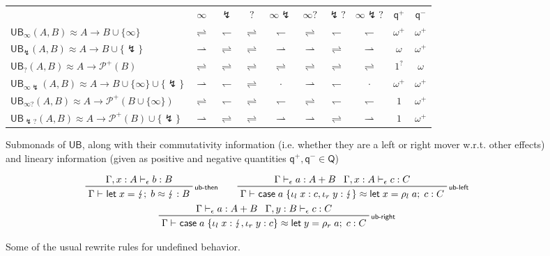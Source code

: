 \documentclass[acmsmall,screen,review]{acmart}
\newcommand{\mc}[1]{\ensuremath{\mathcal{#1}}}
\newcommand{\ms}[1]{\ensuremath{\mathsf{#1}}}
\newcommand{\lto}{:}
\newcommand{\linl}[1]{\iota_l\;{#1}}
\newcommand{\linr}[1]{\iota_r\;{#1}}
\newcommand{\letexpr}[3]{\ensuremath{\ms{let}\;#1 = #2;\;#3}}
\newcommand{\caseexpr}[5]{\ms{case}\;#1\;\{\linl{#2} \lto #3, \linr{#4} \lto #5\}}
\newcommand{\rle}[1]{{\scriptsize\textsf{#1}}}
\newcommand{\hasty}[4]{#1 \vdash_{#2} #3: {#4}}
\newcommand{\teqv}{\approx}
\newcommand{\tmeq}[5]{#1 \vdash_{#2} #3 \teqv #4 : {#5}}
\newcommand{\rightmove}{\rightharpoonup}
\newcommand{\leftmove}{\leftharpoondown}
\newcommand{\slides}{\rightleftharpoons}
\newcommand{\oneq}{1}
\newcommand{\delq}{1^?}
\newcommand{\cpyq}{\omega^+}
\newcommand{\topq}{\omega}
\newcommand{\ubeff}{\lightning}
\begin{document}
\begin{figure}
  \begin{tabular}{l|ccccccccc}
    & $\infty$ & $\ubeff$ & $?$ & $\infty\ubeff$ & $\infty?$ & $\ubeff?$ & $\infty\ubeff?$ 
    & $\ms{q}^+$ & $\ms{q}^-$ \\
    $\ms{UB}_\infty(A, B) \approx A \to B \cup \{\infty\}$ 
    & $\slides$ & $\leftmove$ & $\slides$ & $\leftmove$ & $\slides$ & $\leftmove$ & $\leftmove$ 
    & $\cpyq$ & $\cpyq$ \\ 
    $\ms{UB}_\ubeff(A, B) \approx A \to B \cup \{\ubeff\}$ 
    & $\rightmove$ & $\slides$ & $\slides$ & $\rightmove$ & $\rightmove$ & $\slides$ & $\rightmove$ 
    & $\topq$ & $\cpyq$ \\
    $\ms{UB}_?(A, B) \approx A \to \mc{P}^+(B)$
    & $\slides$ & $\slides$ & $\slides$ & $\slides$ & $\slides$ & $\slides$ & $\slides$ 
    & $\delq$ & $\topq$ \\
    $\ms{UB}_{\infty\ubeff}(A, B) \approx A \to B \cup \{\infty\} \cup \{\ubeff\}$ 
    & $\rightmove$ & $\leftmove$ & $\slides$ & $\cdot$ & $\rightmove$  & $\leftmove$ & $\cdot$ 
    & $\cpyq$ & $\cpyq$ \\
    $\ms{UB}_{\infty?}(A, B) \approx A \to \mc{P}^+(B \cup \{\infty\})$ 
    & $\slides$ & $\leftmove$ & $\slides$ & $\leftmove$ & $\slides$ & $\leftmove$ & $\leftmove$ 
    & $\oneq$ & $\cpyq$ \\ 
    $\ms{UB}_{\ubeff?}(A, B) \approx A \to \mc{P}^+(B) \cup \{\ubeff\}$ 
    & $\rightmove$ & $\slides$ & $\slides$ & $\rightmove$ & $\rightmove$ & $\slides$ & $\rightmove$ 
    & $\oneq$ & $\cpyq$ \\
  \end{tabular}
  \caption{
    Submonads of $\ms{UB}$, along with their commutativity information 
    (i.e. whether they are a left or right mover w.r.t. other effects) and lineary information
    (given as positive and negative quantities $\ms{q}^+, \ms{q}^- \in \ms{Q}$)
  }
  \Description{}
  \label{fig:ub-submonads}
\end{figure}

\begin{figure}
  \begin{gather*}
    \prftree[r]{\rle{ub-then}}
      {\hasty{\Gamma, x : A}{\epsilon}{b}{B}}
      {\tmeq{\Gamma}{}{\letexpr{x}{\ubeff}{b}}{\ubeff}{B}} \qquad
    \prftree[r]{\rle{ub-left}}
      {\hasty{\Gamma}{\epsilon}{a}{A + B}}
      {\hasty{\Gamma, x : A}{\epsilon}{c}{C}}
      {\tmeq{\Gamma}{}{\caseexpr{a}{x}{c}{y}{\ubeff}}{\letexpr{x}{\rho_l\;a}{c}}{C}}
    \\
    \prftree[r]{\rle{ub-right}}
      {\hasty{\Gamma}{\epsilon}{a}{A + B}}
      {\hasty{\Gamma, y : B}{\epsilon}{c}{C}}
      {\tmeq{\Gamma}{}{\caseexpr{a}{x}{\ubeff}{y}{c}}{\letexpr{y}{\rho_r\;a}{c}}{C}}
  \end{gather*}
  \caption{
    Some of the usual rewrite rules for undefined behavior.
  }
  \Description{}
  \label{fig:ub-rewrites}
\end{figure}
\end{document}
